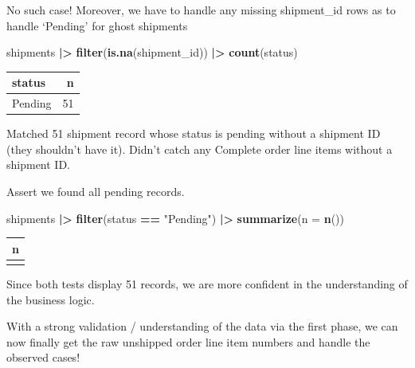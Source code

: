 \documentclass[
]{article}
\newenvironment{Shaded}{\begin{snugshade}}{\end{snugshade}}
\newcommand{\AttributeTok}[1]{\textcolor[rgb]{0.13,0.29,0.53}{#1}}
\newcommand{\FunctionTok}[1]{\textcolor[rgb]{0.13,0.29,0.53}{\textbf{#1}}}
\newcommand{\NormalTok}[1]{#1}
\newcommand{\SpecialCharTok}[1]{\textcolor[rgb]{0.81,0.36,0.00}{\textbf{#1}}}
\newcommand{\StringTok}[1]{\textcolor[rgb]{0.31,0.60,0.02}{#1}}
\newcounter{none} %
\begin{document}
No such case! Moreover, we have to handle any missing shipment\_id rows
as to handle `Pending' for ghost shipments

\begin{Shaded}
\begin{Highlighting}[]
\NormalTok{shipments }\SpecialCharTok{|\textgreater{}} 
  \FunctionTok{filter}\NormalTok{(}\FunctionTok{is.na}\NormalTok{(shipment\_id)) }\SpecialCharTok{|\textgreater{}}
  \FunctionTok{count}\NormalTok{(status)}
\end{Highlighting}
\end{Shaded}

{\def\LTcaptype{none} %
\begin{longtable}[]{@{}lr@{}}
\toprule\noalign{}
status & n \\
\midrule\noalign{}
\endhead
\bottomrule\noalign{}
\endlastfoot
Pending & 51 \\
\end{longtable}
}

Matched 51 shipment record whose status is pending without a shipment ID
(they shouldn't have it). Didn't catch any Complete order line items
without a shipment ID.

Assert we found all pending records.

\begin{Shaded}
\begin{Highlighting}[]
\NormalTok{shipments }\SpecialCharTok{|\textgreater{}}
  \FunctionTok{filter}\NormalTok{(status }\SpecialCharTok{==} \StringTok{"Pending"}\NormalTok{) }\SpecialCharTok{|\textgreater{}}
  \FunctionTok{summarize}\NormalTok{(}\AttributeTok{n =} \FunctionTok{n}\NormalTok{())}
\end{Highlighting}
\end{Shaded}

{\def\LTcaptype{none} %
\begin{longtable}[]{@{}r@{}}
\toprule\noalign{}
n \\
\midrule\noalign{}
\endhead
\bottomrule\noalign{}
\endlastfoot
51 \\
\end{longtable}
}

Since both tests display 51 records, we are more confident in the
understanding of the business logic.

With a strong validation / understanding of the data via the first
phase, we can now finally get the raw unshipped order line item numbers
and handle the observed cases!
\end{document}
